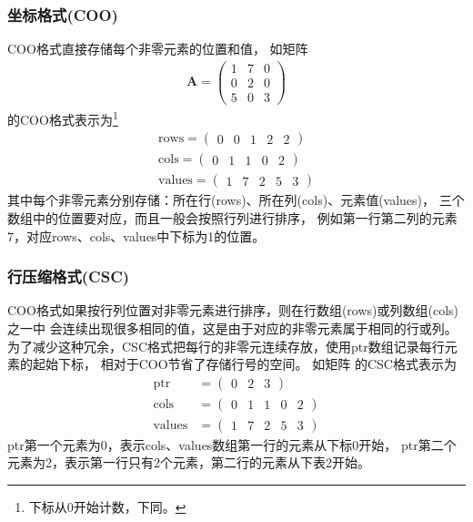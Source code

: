 \subsubsection{坐标格式(COO)}
COO格式直接存储每个非零元素的位置和值，
如矩阵
\begin{align}
\bm{A}=\begin{pmatrix}
1 & 7 & 0\\
0 & 2 & 0\\
5 & 0 & 3
\end{pmatrix}
\label{equ:gpu.sparseformat.example.matrix3}
\end{align}
的COO格式表示为\footnote{下标从0开始计数，下同。}
\begin{align*}
\mathrm{rows}=\begin{pmatrix}
0 & 0 & 1 & 2 & 2  
\end{pmatrix}
\\
\mathrm{cols}=\begin{pmatrix}
0 & 1 & 1 & 0 & 2
\end{pmatrix}
\\
\mathrm{values}=\begin{pmatrix}
1 & 7 & 2 & 5 & 3
\end{pmatrix}
\end{align*}
其中每个非零元素分别存储：所在行(rows)、所在列(cols)、元素值(values)，
三个数组中的位置要对应，而且一般会按照行列进行排序，
例如第一行第二列的元素7，对应rows、cols、values中下标为1的位置。


\subsubsection{行压缩格式(CSC)}
COO格式如果按行列位置对非零元素进行排序，则在行数组(rows)或列数组(cols)之一中
会连续出现很多相同的值，这是由于对应的非零元素属于相同的行或列。
为了减少这种冗余，CSC格式把每行的非零元连续存放，使用ptr数组记录每行元素的起始下标，
相对于COO节省了存储行号的空间。
如矩阵
的CSC格式表示为
\begin{align*}
\mathrm{ptr}&=\begin{pmatrix}
0 & 2 & 3  
\end{pmatrix}
\\
\mathrm{cols}&=\begin{pmatrix}
0 & 1 & 1 & 0 & 2
\end{pmatrix}
\\
\mathrm{values}&=\begin{pmatrix}
1 & 7 & 2 & 5 & 3
\end{pmatrix}
\end{align*}
ptr第一个元素为0，表示cols、values数组第一行的元素从下标0开始，
ptr第二个元素为2，表示第一行只有2个元素，第二行的元素从下表2开始。


